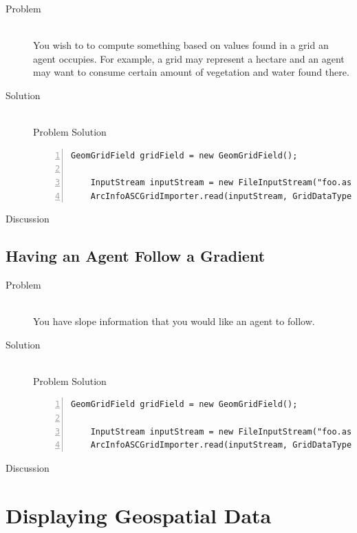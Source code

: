 \documentclass[twoside,10pt]{book}
\begin{document}
\begin{description}
\item[Problem]~\\
You wish to to compute something based on values found in a grid an
agent occupies.  For example, a grid may represent a hectare and an
agent may want to consume certain amount of vegetation and water found there.

\item[Solution]~\\
Problem Solution
\begin{Verbatim}[frame=lines,framesep=5mm,numbers=left,commandchars=+\[\]]
	GeomGridField gridField = new GeomGridField();
	
	InputStream inputStream = new FileInputStream("foo.asc");
	ArcInfoASCGridImporter.read(inputStream, GridDataType.INTEGER, gridField);
\end{Verbatim}

\item[Discussion ]
\end{description}



\section{Having an Agent Follow a Gradient}
\label{sec:followinggradients}

\begin{description}
\item[Problem]~\\
You have slope information that you would like an agent to follow.

\item[Solution]~\\
Problem Solution
\begin{Verbatim}[frame=lines,framesep=5mm,numbers=left,commandchars=+\[\]]
	GeomGridField gridField = new GeomGridField();
	
	InputStream inputStream = new FileInputStream("foo.asc");
	ArcInfoASCGridImporter.read(inputStream, GridDataType.INTEGER, gridField);
\end{Verbatim}

\item[Discussion ]
\end{description}






\chapter{Displaying Geospatial Data}
\label{ch:displaying}
\end{document}
